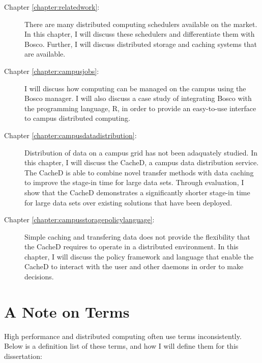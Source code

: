 \begin{description}
	\item[Chapter \ref{chapter:relatedwork}:]  There are many distributed computing schedulers available on the market.  In this chapter, I will discuss these schedulers and differentiate them with Bosco.  Further, I will discuss distributed storage and caching systems that are available.
	
	\item[Chapter \ref{chapter:campusjobs}:] I will discuss how computing can be managed on the campus using the Bosco manager.  I will also discuss a case study of integrating Bosco with the programming language, R, in order to provide an easy-to-use interface to campus distributed computing.
	
	\item[Chapter \ref{chapter:campusdatadistribution}:] Distribution of data on a campus grid has not been adaquately studied.  In this chapter, I will discuss the CacheD, a campus data distribution service.  The CacheD is able to combine novel transfer methods with data caching to improve the stage-in time for large data sets.  Through evaluation, I show that the CacheD demonstrates a significantly shorter stage-in time for large data sets over existing solutions that have been deployed.
	
	\item[Chapter \ref{chapter:campusstoragepolicylanguage}:]  
	Simple caching and transfering data does not provide the flexibility that the CacheD requires to operate in a distributed environment.  In this chapter, I will discuss the policy framework and language that enable the CacheD to interact with the user and other daemons in order to make decisions.
\end{description}


\newpage
\section{A Note on Terms}
High performance and distributed computing often use terms inconsistently.  Below is a definition list of these terms, and how I will define them for this dissertation:



